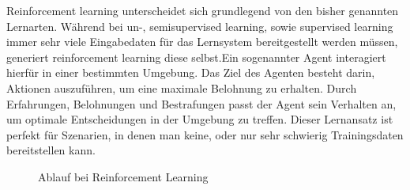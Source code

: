 Reinforcement learning unterscheidet sich grundlegend von den bisher genannten
Lernarten. Während bei un-, semisupervised learning, sowie supervised learning
immer sehr viele Eingabedaten für das Lernsystem bereitgestellt werden müssen,
generiert reinforcement learning diese selbst.Ein sogenannter Agent interagiert
hierfür in einer bestimmten Umgebung. Das Ziel des Agenten besteht darin,
Aktionen auszuführen, um eine maximale Belohnung zu erhalten. Durch
Erfahrungen, Belohnungen und Bestrafungen passt der Agent sein Verhalten an, um
optimale Entscheidungen in der Umgebung zu treffen. Dieser Lernansatz ist
perfekt für Szenarien, in denen man keine, oder nur sehr schwierig
Trainingsdaten bereitstellen kann. \cite{lanquillon2019grundzuge}

\begin{figure}
    \centering
    
    \caption[width=0.4\textwidth]{Ablauf bei Reinforcement Learning}
    \label{fig:disreinforcementlearning}
\end{figure}